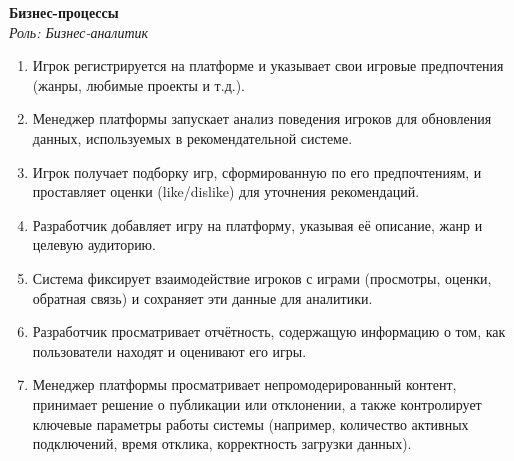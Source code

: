 \documentclass[a4paper,12pt]{article}
\begin{document}
\begin{center}
    {\Large \textbf{Бизнес-процессы}}\\[5pt]
    \textit{Роль: Бизнес-аналитик}\\[10pt]
\end{center}

\begin{enumerate}[leftmargin=1.2cm]
    \item Игрок регистрируется на платформе и указывает свои игровые предпочтения (жанры, любимые проекты и т.д.).
    \item Менеджер платформы запускает анализ поведения игроков для обновления данных, используемых в рекомендательной системе.
    \item Игрок получает подборку игр, сформированную по его предпочтениям, и проставляет оценки (like/dislike) для уточнения рекомендаций.
    \item Разработчик добавляет игру на платформу, указывая её описание, жанр и целевую аудиторию.
    \item Система фиксирует взаимодействие игроков с играми (просмотры, оценки, обратная связь) и сохраняет эти данные для аналитики.
    \item Разработчик просматривает отчётность, содержащую информацию о том, как пользователи находят и оценивают его игры.
    \item Менеджер платформы просматривает непромодерированный контент, принимает решение о публикации или отклонении, а также контролирует ключевые параметры работы системы (например, количество активных подключений, время отклика, корректность загрузки данных).
\end{enumerate}
\end{document}

